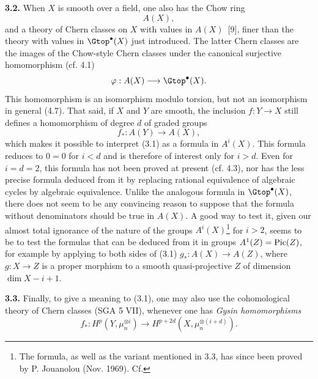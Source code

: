 \textbf{3.2.} When $X$ is smooth over a field, one also has the Chow ring
\[
  A(X),
\]
and a theory of Chern classes on $X$ with values in $A(X)$~[9], finer than the theory with values in $\Gtop^\bullet(X)$ just introduced. The latter Chern classes are the images of the Chow-style Chern classes under the canonical surjective homomorphism (cf. 4.1)
\[
  \varphi:A(X)\longrightarrow\Gtop^\bullet(X).
\]
This homomorphism is an isomorphism modulo torsion, but not an isomorphism in general (4.7). That said, if $X$ and $Y$ are smooth, the inclusion $f:Y\to X$ still defines a homomorphism of degree $d$ of graded groups
\[
  f_*:A(Y)\longrightarrow A(X),
\]
which makes it possible to interpret (3.1) as a formula in $A^i(X)$.
This formula reduces to $0=0$ for $i<d$ and is therefore of interest
only for $i>d$. Even for $i=d=2$, this formula has not been proved at
present (cf. 4.3), nor has the less precise formula deduced from it by
replacing rational equivalence of algebraic cycles by algebraic
equivalence. Unlike the analogous formula in $\Gtop^\bullet(X)$, there
does not seem to be any convincing reason to suppose that the formula
without denominators should be true in $A(X)$. A good way to test it,
given our almost total ignorance of the nature of the groups
$A^i(X)$\footnote{The formula, as well as the variant mentioned in 3.3,
has since been proved by P. Jouanolou (Nov. 1969). Cf.} for $i>2$, seems
to be to test the formulas that can be deduced from it in groups
$A^1(Z)=\operatorname{Pic}(Z)$, for example by applying to both sides of (3.1)
$g_*:A(X)\longrightarrow A(Z)$,
where $g:X\to Z$ is a proper morphism to a smooth quasi-projective $Z$ of dimension $\dim X-i+1$.

\textbf{3.3.} Finally, to give a meaning to (3.1), one may also use the cohomological theory of Chern classes (SGA 5 VII), whenever one has \emph{Gysin homomorphisms}
\[
  f_*:H^p(Y,\mu_n^{\otimes i})
  \longrightarrow H^{p+2d}(X,\mu_n^{\otimes(i+d)}).
\]
